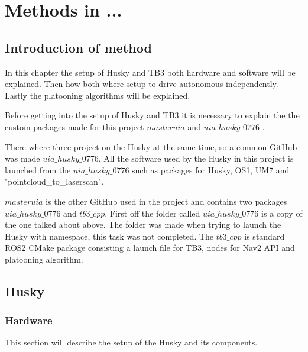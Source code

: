 \chapter{Methods in ...} %


\section{Introduction of method}
In this chapter the setup of Husky and TB3 both hardware and software will be explained. Then how both where setup to drive autonomous independently. Lastly the platooning algorithms will be explained. 

Before getting into the setup of Husky and TB3 it is necessary to explain the the custom packages made for this project $masteruia$ \cite{masteruia} and $uia\_husky\_0776$ \cite{uiahusky}. 

There where three project on the Husky at the same time, so a common GitHub was made $uia\_husky\_0776$. All the software used by the Husky in this project is launched from the $uia\_husky\_0776$ such as packages for Husky, OS1, UM7 and "pointcloud\_to\_laserscan".

$masteruia$ is the other GitHub used in the project and contains two packages $uia\_husky\_0776$ and $tb3\_cpp$.
First off the folder called $uia\_husky\_0776$ is a copy of the one talked about above. The folder was made when trying to launch the Husky with namespace, this task was not completed. 
The $tb3\_cpp$ is standard ROS2 CMake package consisting a launch file for TB3, nodes for Nav2 API and platooning algorithm. 
                      
\section{Husky}
\subsection{Hardware}
This section will describe the setup of the Husky and its components. 

